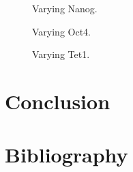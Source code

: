 \begin{figure}
\begin{minipage}{\textwidth}
\centering
\begin{minipage}[t]{0.3\textwidth}
\centering
\graphicspath{{../Plots/}}

\caption{Varying Nanog.}
\label{pl:N_0.1}
\end{minipage}
\hfill
\begin{minipage}[t]{0.3\textwidth}
\centering
\graphicspath{{../Plots/}}

\caption{Varying Oct4.}
\label{pl:O_0.1}
\end{minipage}
\hfill
\begin{minipage}[t]{0.3\textwidth}
\centering
\graphicspath{{../Plots/}}

\caption{Varying Tet1.}
\label{pl:T_0.1}
\end{minipage}
\end{minipage}
\end{figure}


\section{Conclusion}

\newpage
\section*{Bibliography}
\nocite{*}
\printbibliography[heading=none, keyword={secondary}]



